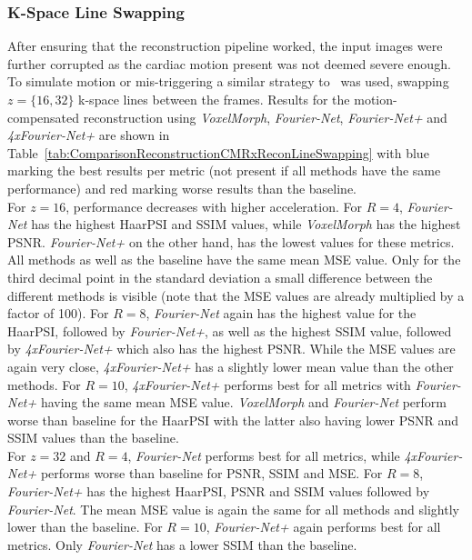 \subsubsection{K-Space Line Swapping}
After ensuring that the reconstruction pipeline worked, the input images were further corrupted as the cardiac motion present was not deemed severe enough. To simulate motion or mis-triggering a similar strategy to~\cite{Oksuz2020} was used, swapping $z=\{16,32\}$ k-space lines between the frames. Results for the motion-compensated reconstruction using \emph{VoxelMorph}, \emph{Fourier-Net}, \emph{Fourier-Net+} and \emph{4xFourier-Net+} are shown in Table~\ref{tab:ComparisonReconstructionCMRxReconLineSwapping} with blue marking the best results per metric (not present if all methods have the same performance) and red marking worse results than the baseline.\\
For $z=16$, performance decreases with higher acceleration. For $R=4$, \emph{Fourier-Net} has the highest HaarPSI and SSIM values, while \emph{VoxelMorph} has the highest PSNR. \emph{Fourier-Net+} on the other hand, has the lowest values for these metrics. All methods as well as the baseline have the same mean MSE value. Only for the third decimal point in the standard deviation a small difference between the different methods is visible (note that the MSE values are already multiplied by a factor of 100). %
For $R=8$, \emph{Fourier-Net} again has the highest value for the HaarPSI, followed by \emph{Fourier-Net+}, as well as the highest SSIM value, followed by \emph{4xFourier-Net+} which also has the highest PSNR. While the MSE values are again very close, \emph{4xFourier-Net+} has a slightly lower mean value than the other methods.%
For $R=10$, \emph{4xFourier-Net+} performs best for all metrics with \emph{Fourier-Net+} having the same mean MSE value. \emph{VoxelMorph} and \emph{Fourier-Net} perform worse than baseline for the HaarPSI with the latter also having lower PSNR and SSIM values than the baseline.\\
For $z=32$ and $R=4$, \emph{Fourier-Net} performs best for all metrics, while \emph{4xFourier-Net+} performs worse than baseline for PSNR, SSIM and MSE. For $R=8$, \emph{Fourier-Net+} has the highest HaarPSI, PSNR and SSIM values followed by \emph{Fourier-Net}. The mean MSE value is again the same for all methods and slightly lower than the baseline. For $R=10$, \emph{Fourier-Net+} again performs best for all metrics. Only \emph{Fourier-Net} has a lower SSIM than the baseline.

